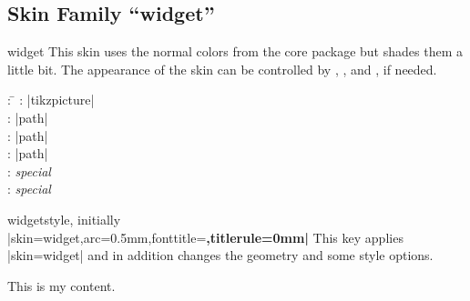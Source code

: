 \begin{dispExample}
\end{dispExample}



\clearpage
\subsection{Skin Family \enquote{widget}}
\begin{docSkin}{widget}
  This skin uses the normal colors from the core package but shades
  them a little bit.
  The appearance of the skin can be controlled by ,
  , and ,
  if needed.
\begin{tcolorbox}[skintable=widget]
  \begin{tabbing}
    : \=\kill
    :  \> |tikzpicture|\\ 
    :           \> |path|\\
    : \> |path|\\ 
    :        \> |path|\\
    :    \> \emph{special}\\
    :           \> \emph{special}
  \end{tabbing}
\end{tcolorbox}
\end{docSkin}


\begin{docTcbKey}[][doc updated={2020-09-23}]{widget}{}{style, initially\\
  |skin=widget,arc=0.5mm,fonttitle=\bfseries,titlerule=0mm|
}
  This key applies |skin=widget| and in addition changes the geometry and some style options.
\end{docTcbKey}


\begin{dispExample}
\end{dispExample}


\begin{dispExample}
\begin{tcolorbox}[widget,colback=Salmon!50!white,colframe=FireBrick!75!black,
  adjusted title=A colored box with the \enquote{widget} skin]
This is my content.
\end{tcolorbox}
\end{dispExample}

